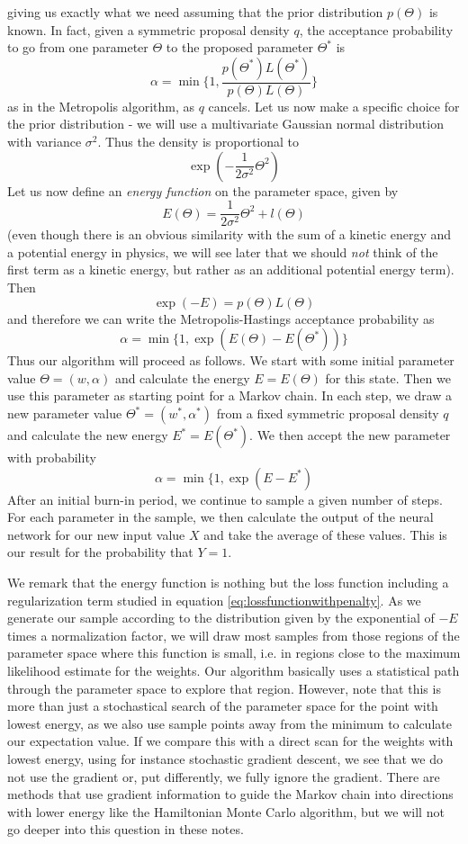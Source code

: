 \documentclass[a4paper, draft]{report}
\numberwithin{section}{chapter}
\numberwithin{equation}{chapter}
\theoremstyle{own}
\theoremstyle{remark}
\begin{document}
giving us exactly what we need assuming that the prior distribution $p(\Theta)$ is known. In fact, given a symmetric proposal density $q$, the acceptance probability to go from one parameter $\Theta$ to the proposed parameter $\Theta^*$ is
$$
\alpha = \min \{
1,
\frac{p(\Theta^*)L(\Theta^*)}{p(\Theta)L(\Theta)}
\}
$$
as in the Metropolis algorithm, as $q$ cancels. Let us now make a specific choice for the prior distribution - we will use a multivariate Gaussian normal distribution with variance $\sigma^2$. Thus the density is proportional to
$$
\exp(- \frac{1}{2\sigma^2} \Theta^2)
$$
Let us now define an {\em energy function} on the parameter space, given by
$$
E(\Theta) = \frac{1}{2\sigma^2} \Theta^2 + l(\Theta)
$$
(even though there is an obvious similarity with the sum of a kinetic energy and a potential energy in physics, we will see later that we should {\em not} think of the first term as a kinetic energy, but rather as an additional potential energy term).
Then
$$
\exp(-E) = p(\Theta) L(\Theta)
$$
and therefore we can write the Metropolis-Hastings acceptance probability as
$$
\alpha = \min \{1,
\exp(E(\Theta) - E(\Theta^*))
\}
$$
Thus our algorithm will proceed as follows. We start with some initial parameter value $\Theta = (w,\alpha)$ and calculate the energy $E = E(\Theta)$ for this state. Then we use this parameter as starting point for a Markov chain.  In each step, we draw a new parameter value $\Theta^* = (w^*, \alpha^*)$ from a fixed symmetric proposal density $q$ and calculate the new energy $E^* = E(\Theta^*)$. We then accept the new parameter
with probability
$$
\alpha = \min \{1,
\exp(E - E^*)
$$ 
After an initial burn-in period, we continue to sample a given number of steps. For each parameter in the sample, we then calculate the output of the neural network for our new input value $X$ and take the average of these values. This is our result for the probability that $Y = 1$. 

We remark that the energy function is nothing but the loss function including a regularization term studied in equation \eqref{eq:lossfunctionwithpenalty}. As we generate our sample according to the distribution given by the exponential of $-E$ times a normalization factor, we will draw most samples from those regions of the parameter space where this function is small, i.e. in regions close to the maximum likelihood estimate for the weights. Our algorithm basically uses a statistical path through the parameter space to explore that region. However, note that this is more than just a stochastical search of the parameter space for the point with lowest energy, as we also use sample points away from the minimum to calculate our expectation value. If we compare this with a direct scan for the weights with lowest energy, using for instance stochastic gradient descent, we see that we do not use the gradient or, put differently, we fully ignore the gradient. There are methods that use gradient information to guide the Markov chain into directions with lower energy like the Hamiltonian Monte Carlo algorithm, but we will not go deeper into this question in these notes.
\end{document}
